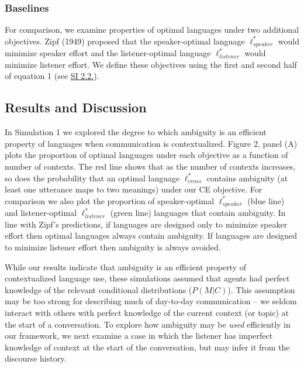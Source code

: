 \documentclass[10pt, letterpaper]{article}
\begin{document}
\subsubsection{Baselines}\label{baselines}

For comparison, we examine properties of optimal languages under two
additional objectives. Zipf (1949) proposed that the speaker-optimal
language \(\ell_{speaker}^*\) would minimize speaker effort and the
listener-optimal language \(\ell_{listener}^*\) would minimize listener
effort. We define these objectives using the first and second half of
equation 1 (see \href{https://bit.ly/2RBSGcU}{SI 2.2.}).\par

\subsection{Results and Discussion}\label{results-and-discussion}

In Simulation 1 we explored the degree to which ambiguity is an
efficient property of languages when communication is contextualized.
Figure 2, panel (A) plots the proportion of optimal languages under each
objective as a function of number of contexts. The red line shows that
as the number of contexts increases, so does the probability that an
optimal language \(\ell^*_{cross}\) contains ambiguity (at least one
utterance maps to two meanings) under our CE objective. For comparison
we also plot the proportion of speaker-optimal \(\ell^*_{speaker}\)
(blue line) and listener-optimal \(\ell^*_{listener}\) (green line)
languages that contain ambiguity. In line with Zipf's predictions, if
languages are designed only to minimize speaker effort then optimal
languages always contain ambiguity. If languages are designed to
minimize listener effort then ambiguity is always avoided.\par

While our results indicate that ambiguity is an efficient property of
contextualized language use, these simulations assumed that agents had
perfect knowledge of the relevant conditional distributions
(\(P(M|C)\)). This assumption may be too strong for describing much of
day-to-day communication -- we seldom interact with others with perfect
knowledge of the current context (or topic) at the start of a
conversation. To explore how ambiguity may be \textit{used} efficiently
in our framework, we next examine a case in which the listener has
imperfect knowledge of context at the start of the conversation, but may
infer it from the discourse history.\par
\end{document}
